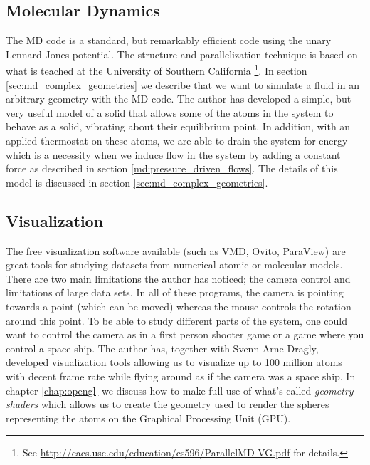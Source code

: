 \subsection{Molecular Dynamics}
The MD code is a standard, but remarkably efficient code using the unary Lennard-Jones potential. The structure and parallelization technique is based on what is teached at the University of Southern California \footnote{See \url{http://cacs.usc.edu/education/cs596/ParallelMD-VG.pdf} for details.}. In section \ref{sec:md_complex_geometries} we describe that we want to simulate a fluid in an arbitrary geometry with the MD code. The author has developed a simple, but very useful model of a solid that allows some of the atoms in the system to behave as a solid, vibrating about their equilibrium point. In addition, with an applied thermostat on these atoms, we are able to drain the system for energy which is a necessity when we induce flow in the system by adding a constant force as described in section \ref{md:pressure_driven_flows}. The details of this model is discussed in section \ref{sec:md_complex_geometries}.
\subsection{Visualization}
The free visualization software available (such as VMD, Ovito, ParaView) are great tools for studying datasets from numerical atomic or molecular models. There are two main limitations the author has noticed; the camera control and limitations of large data sets. In all of these programs, the camera is pointing towards a point (which can be moved) whereas the mouse controls the rotation around this point. To be able to study different parts of the system, one could want to control the camera as in a first person shooter game or a game where you control a space ship. The author has, together with Svenn-Arne Dragly, developed visualization tools allowing us to visualize up to 100 million atoms with decent frame rate while flying around as if the camera was a space ship. In chapter \ref{chap:opengl} we discuss how to make full use of what's called \textit{geometry shaders} which allows us to create the geometry used to render the spheres representing the atoms on the Graphical Processing Unit (GPU).
